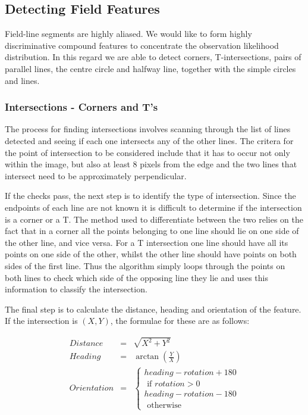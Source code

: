 \documentclass[runningheads,a4paper]{llncs}
\begin{document}
\subsection{Detecting Field Features}
Field-line segments are highly aliased. We would like to form highly discriminative compound features to concentrate the observation likelihood distribution. In this regard we are able to detect corners, T-intersections, pairs of parallel lines, the centre circle and halfway line, together with the simple circles and lines.

\subsubsection{Intersections - Corners and T's}
The process for finding intersections involves scanning through the list of lines detected and seeing if each one intersects any of the other lines. The critera for the point of intersection to be considered include that it has to occur not only within the image, but also at least 8 pixels from the edge and the two lines that intersect need to be approximately perpendicular.

If the checks pass, the next step is to identify the type of intersection. Since the endpoints of each line are not known it is difficult to determine if the intersection is a corner or a T. The method used to differentiate between the two relies on the fact that in a corner all the points belonging to one line should lie on one side of the other line, and vice versa. For a T intersection one line should have all its points on one side of the other, whilst the other line should have points on both sides of the first line. Thus the algorithm simply loops through the points on both lines to check which side of the opposing line they lie and uses this information to classify the intersection.

The final step is to calculate the distance, heading and orientation of the feature. If the intersection is $(X,Y)$, the formulae for these are as follows:

\begin{eqnarray}
Distance &=& \sqrt{X^2 + Y^2}\\
Heading &=& \arctan{(\frac{Y}{X})}\\
Orientation &=& \left\{ \begin{array}{rl}
heading - rotation + 180\\ \mbox{ if $rotation > 0$} \\
heading - rotation - 180\\ \mbox{ otherwise}
\end{array} \right.
\end{eqnarray}
\end{document}

